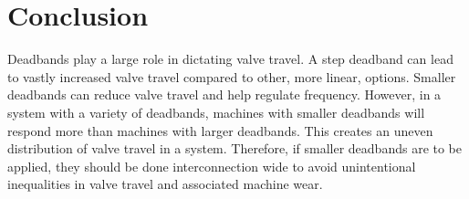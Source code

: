 \section{Conclusion}
Deadbands play a large role in dictating valve travel.
A step deadband can lead to vastly increased valve travel compared to other, more linear, options.
Smaller deadbands can reduce valve travel and help regulate frequency.
However, in a system with a variety of deadbands, machines with smaller deadbands will respond more than machines with larger deadbands.
This creates an uneven distribution of valve travel in a system.
Therefore, if smaller deadbands are to be applied, they should be done interconnection wide to avoid unintentional inequalities in valve travel and associated machine wear.